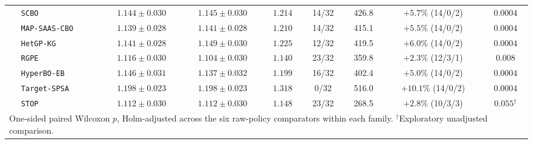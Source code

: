 \begin{table}[htbp]
{\begin{tabular}{llccccccc}
 & \texttt{SCBO} & $1.144 \pm 0.030$ & $1.145 \pm 0.030$ & $1.214$ & 14/32 & 426.8 & $+5.7\%$ (14/0/2) & $0.0004$ \\
 & \texttt{MAP-SAAS-CBO} & $1.139 \pm 0.028$ & $1.141 \pm 0.028$ & $1.210$ & 14/32 & 415.1 & $+5.5\%$ (14/0/2) & $0.0004$ \\
 & \texttt{HetGP-KG} & $1.141 \pm 0.028$ & $1.149 \pm 0.030$ & $1.225$ & 12/32 & 419.5 & $+6.0\%$ (14/0/2) & $0.0004$ \\
 & \texttt{RGPE} & $1.116 \pm 0.030$ & $1.104 \pm 0.030$ & $1.140$ & 23/32 & 359.8 & $+2.3\%$ (12/3/1) & $0.008$ \\
 & \texttt{HyperBO-EB} & $1.146 \pm 0.031$ & $1.137 \pm 0.032$ & $1.199$ & 16/32 & 402.4 & $+5.0\%$ (14/0/2) & $0.0004$ \\
 & \texttt{Target-SPSA} & $1.198 \pm 0.023$ & $1.198 \pm 0.023$ & $1.318$ & 0/32 & 516.0 & $+10.1\%$ (14/0/2) & $0.0004$ \\
 & \texttt{STOP} & $1.112 \pm 0.030$ & $1.112 \pm 0.030$ & $1.148$ & 23/32 & 268.5 & $+2.8\%$ (10/3/3) & $0.055{}^{\dagger}$ \\
\bottomrule
\multicolumn{9}{l}{\scriptsize One-sided paired Wilcoxon $p$, Holm-adjusted across the six raw-policy comparators within each family. $^{\dagger}$Exploratory unadjusted comparison.}\\
\end{tabular}%
}
\end{table}